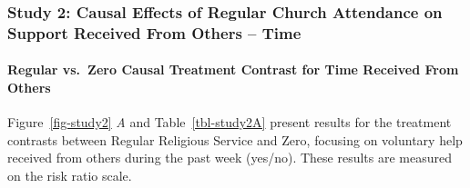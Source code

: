 \documentclass[
  single column]{article}
\let\oldparagraph\paragraph
\renewcommand{\paragraph}[1]{\oldparagraph{#1}\mbox{}}
\begin{document}
\newpage{}

\subsubsection{Study 2: Causal Effects of Regular Church Attendance on
Support Received From Others --
Time}\label{study-2-causal-effects-of-regular-church-attendance-on-support-received-from-others-time}

\paragraph{Regular vs.~Zero Causal Treatment Contrast for Time Received
From
Others}\label{regular-vs.-zero-causal-treatment-contrast-for-time-received-from-others}

Figure~\ref{fig-study2} \emph{A} and Table~\ref{tbl-study2A} present
results for the treatment contrasts between Regular Religious Service
and Zero, focusing on voluntary help received from others during the
past week (yes/no). These results are measured on the risk ratio scale.
\end{document}
